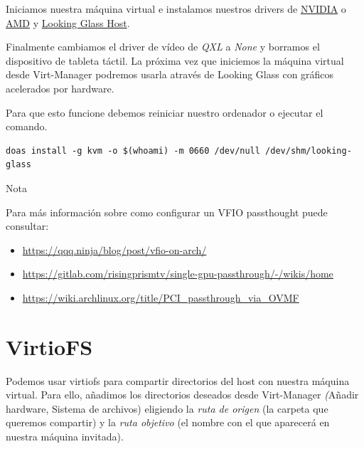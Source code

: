\documentclass[11pt]{article}
\begin{document}
Iniciamos nuestra máquina virtual e instalamos nuestros drivers de \href{https://www.nvidia.es/Download/index.aspx?lang=es}{NVIDIA} o \href{https://www.amd.com/es/support}{AMD} y \href{https://looking-glass.io/downloads}{Looking Glass Host}.

\vspace{5pt}

Finalmente cambiamos el driver de vídeo de \emph{QXL} a \emph{None} y borramos el dispositivo de tableta táctil. La próxima vez que iniciemos la máquina virtual desde Virt-Manager podremos usarla através de Looking Glass con gráficos acelerados por hardware.

\noindent Para que esto funcione debemos reiniciar nuestro ordenador o ejecutar el comando.

\begin{verbatim}
doas install -g kvm -o $(whoami) -m 0660 /dev/null /dev/shm/looking-glass
\end{verbatim}

\begin{mybox}{Nota}

Para más información sobre como configurar un VFIO passthought puede consultar:

\vspace{-7.5pt}

\begin{itemize}
\setlength\itemsep{-0.3em}
\item \href{https://qqq.ninja/blog/post/vfio-on-arch/}
{https://qqq.ninja/blog/post/vfio-on-arch/}
\item \href{https://gitlab.com/risingprismtv/single-gpu-passthrough/-/wikis/home}
{https://gitlab.com/risingprismtv/single-gpu-passthrough/-/wikis/home}
\item \href{https://wiki.archlinux.org/title/PCI\_passthrough\_via\_OVMF}
{https://wiki.archlinux.org/title/PCI\_passthrough\_via\_OVMF}
\end{itemize}
\end{mybox}

\section{VirtioFS}

Podemos usar virtiofs para compartir directorios del host con nuestra máquina virtual. Para ello, añadimos los directorios deseados desde Virt-Manager \emph(Añadir hardware, Sistema de archivos) eligiendo la \emph{ruta de origen} (la carpeta que queremos compartir) y la \emph{ruta objetivo} (el nombre con el que aparecerá en nuestra máquina invitada).
\end{document}
